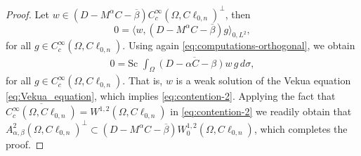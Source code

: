 \documentclass[12pt]{article}
\begin{document}
\begin{proof}
Let $w \in (D-M^{\alpha}C-\overline{\beta})C_{c}^{\infty}(\Omega,C\ell_{0,n})^{\bot}$, then
\[
0=\nonumber \langle w, (D-M^{\alpha}C-\overline{\beta})g \rangle_{0,L^2},
\]
for all $g\in C_{c}^{\infty}(\Omega,C\ell_{0,n})$. Using again \eqref{eq:computations-orthogonal}, we obtain
\begin{align*}%
0=\text{Sc }\int_{\Omega} \overline{(D-\alpha C-\beta)w} \, g\, d\sigma,
\end{align*}
for all $g\in C_{c}^{\infty}(\Omega,C\ell_{0,n})$. That is, $w$ is a weak solution of the Vekua equation \eqref{eq:Vekua_equation}, which implies \eqref{eq:contention-2}. Applying the fact that $\overline{C_{c}^{\infty}(\Omega,C\ell_{0,n})}=W^{1,2}(\Omega,C\ell_{0,n})$ in \eqref{eq:contention-2} we readily obtain that $A_{\alpha,\beta}^2(\Omega,C\ell_{0,n})^{\bot}\subset (D-M^{\alpha}C-\overline{\beta}) W_0^{1,2}(\Omega,C\ell_{0,n})$, which completes the proof.
\end{proof}
\end{document}
